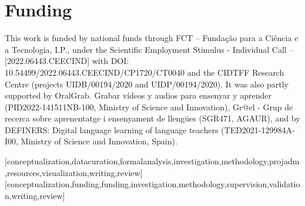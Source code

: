 \documentclass[english]{textolivre}
\begin{document}
\begin{polyabstract}
\begin{portuguese}
\begin{abstract}
\end{abstract}
\end{portuguese}
\end{polyabstract}

%
%
%
%


\section*{Funding}\label{sec-funding}
This work is funded by national funds through FCT – Fundação para a Ciência e a Tecnologia,
I.P., under the Scientific Employment Stimulus - Individual Call – [2022.06443.CEECIND] with DOI: 
10.54499/\allowbreak{}2022.06443.\allowbreak{}CEECIND/\allowbreak{}CP1720/\allowbreak{}CT0040 
and the CIDTFF Research Centre (projects UIDB/00194/2020 and UIDP/00194/2020).
It was also partly supported by OralGrab. Grabar vídeos y audios para ensenyar y aprender (PID2022-141511NB-100, Ministry of Science and Innovation), Gr@el - Grup de recerca sobre aprenentatge i ensenyament de llengües (SGR471, AGAUR), and by DEFINERS: Digital language learning of language teachers (TED2021-129984A-I00, Ministry of Science and Innovation, Spain).


\printbibliography
\label{sec-bib}
\begin{contributors}
[conceptualization,datacuration,formalanalysis,investigation,methodology,projadm,resources,visualization,writing,review]
[conceptualization,funding,funding,investigation,methodology,supervision,validation,writing,review]
\end{contributors}


\newpage

\end{document}
